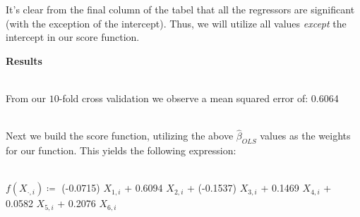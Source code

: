 \documentclass[11pt,english]{article}
\begin{document}
\begin{table}[ht]
\centering
{}
\caption{Predictor Significance} 
\end{table}
It's clear from the final column of the tabel that all the regressors are significant (with the exception of the intercept). Thus, we will utilize all values \emph{except} the intercept in our score function. \\
\newpage


{\large\textbf{Results}} \\\

From our $10$-fold cross validation we observe a mean squared error of: 0.6064 \\\

Next we build the score function, utilizing the above $\hat{\beta}_{OLS}$ values as the weights for our function. This yields the following expression:\\\

$f(X_{\cdot,i}) \coloneqq $ (-0.0715)  $  X_{1,i}$ + 0.6094 $  X_{2,i}$ + (-0.1537) $  X_{3,i}$ + 0.1469 $  X_{4,i}$ + 0.0582 $  X_{5,i}$ + 0.2076 $  X_{6,i}$ \\\
\end{document}
